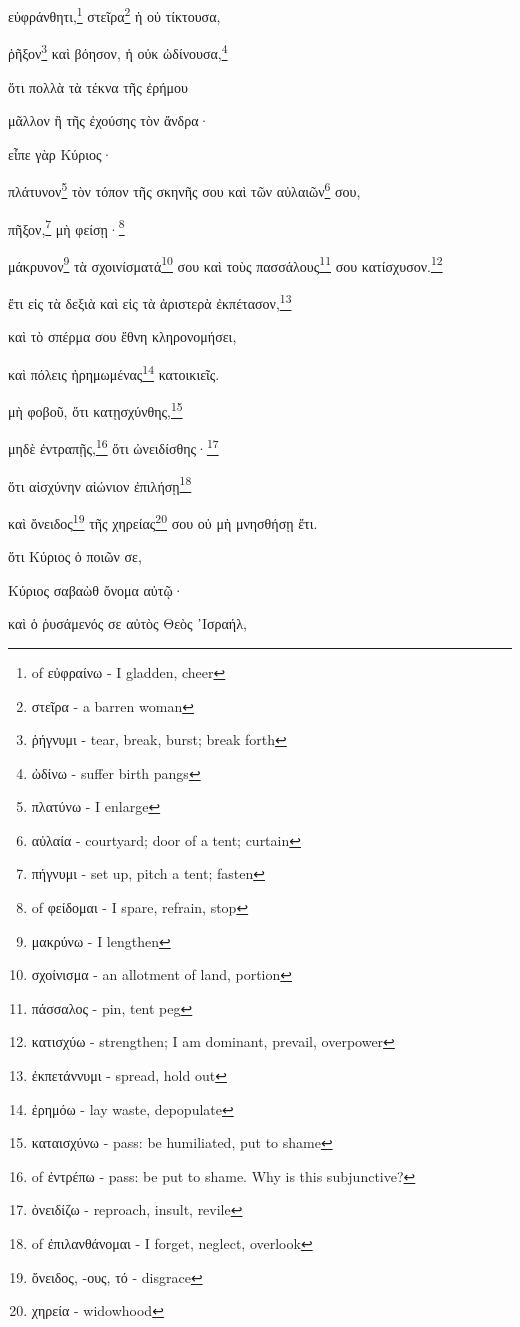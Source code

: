 



εὐφράνθητι,\footnote{ of εὐφραίνω - I gladden, cheer}
στεῖρα\footnote{στεῖρα - a barren woman}
ἡ
οὐ
τίκτουσα,

ῥῆξον\footnote{ῥήγνυμι - tear, break, burst; break forth}
καὶ
βόησον,
ἡ
οὐκ
ὠδίνουσα,\footnote{ὠδίνω - suffer birth pangs}

ὅτι
πολλὰ
τὰ
τέκνα
τῆς
ἐρήμου

μᾶλλον
ἢ
τῆς
ἐχούσης
τὸν
ἄνδρα·

εἶπε
γὰρ
Κύριος·

πλάτυνον\footnote{πλατύνω - I enlarge}
τὸν
τόπον
τῆς
σκηνῆς
σου
καὶ
τῶν
αὐλαιῶν\footnote{αὐλαία - courtyard; door of a tent; curtain}
σου,

πῆξον,\footnote{πήγνυμι - set up, pitch a tent; fasten}
μὴ
φείσῃ·\footnote{ of φείδομαι - I spare, refrain, stop}

μάκρυνον\footnote{μακρύνω - I lengthen}
τὰ
σχοινίσματά\footnote{σχοίνισμα - an allotment of land, portion}
σου
καὶ
τοὺς
πασσάλους\footnote{πάσσαλος - pin, tent peg}
σου
κατίσχυσον.\footnote{κατισχύω - strengthen; I am dominant, prevail, overpower}

ἔτι
εἰς
τὰ
δεξιὰ
καὶ
εἰς
τὰ
ἀριστερὰ
ἐκπέτασον,\footnote{ἐκπετάννυμι - spread, hold out}

καὶ
τὸ
σπέρμα
σου
ἔθνη
κληρονομήσει,

καὶ
πόλεις
ἠρημωμένας\footnote{ἐρημόω - lay waste, depopulate}
κατοικιεῖς.

μὴ
φοβοῦ,
ὅτι
κατῃσχύνθης,\footnote{καταισχύνω - pass: be humiliated, put to shame}

μηδὲ
ἐντραπῇς,\footnote{ of ἐντρέπω - pass: be put to shame. Why is this subjunctive?}
ὅτι
ὠνειδίσθης·\footnote{ὀνειδίζω - reproach, insult, revile}

ὅτι
αἰσχύνην
αἰώνιον
ἐπιλήσῃ\footnote{ of ἐπιλανθάνομαι - I forget, neglect, overlook}

καὶ
ὄνειδος\footnote{ὄνειδος, -ους, τό - disgrace}
τῆς
χηρείας\footnote{χηρεία - widowhood}
σου
οὐ
μὴ
μνησθήσῃ
ἔτι.

ὅτι
Κύριος
ὁ
ποιῶν
σε,

Κύριος
σαβαὼθ
ὄνομα
αὐτῷ·

καὶ
ὁ
ῥυσάμενός
σε
αὐτὸς
Θεὸς
᾿Ισραήλ,


